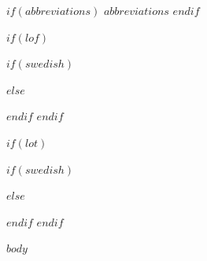 \documentclass[a4paper,11pt]{article}
\begin{document}
$if(abbreviations)$
\newpage
$abbreviations$
$endif$

$if(lof)$
\newpage
\listoffigures
$if(swedish)$
$else$
$endif$
$endif$

$if(lot)$
\newpage
\listoftables
$if(swedish)$
$else$
$endif$
$endif$

\newpage
\pagestyle{plain}       
\setcounter{page}{1}    %

$body$

\end{document}
